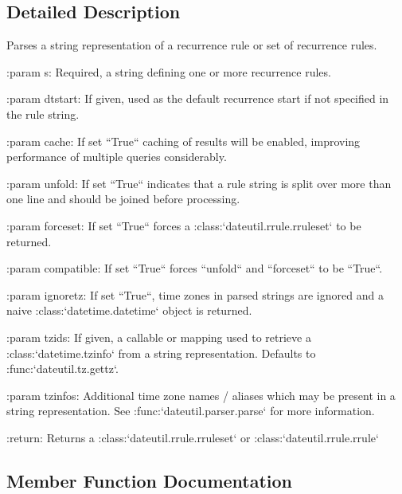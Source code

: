 \subsection{Detailed Description}
\begin{DoxyVerb}Parses a string representation of a recurrence rule or set of
recurrence rules.

:param s:
    Required, a string defining one or more recurrence rules.

:param dtstart:
    If given, used as the default recurrence start if not specified in the
    rule string.

:param cache:
    If set ``True`` caching of results will be enabled, improving
    performance of multiple queries considerably.

:param unfold:
    If set ``True`` indicates that a rule string is split over more
    than one line and should be joined before processing.

:param forceset:
    If set ``True`` forces a :class:`dateutil.rrule.rruleset` to
    be returned.

:param compatible:
    If set ``True`` forces ``unfold`` and ``forceset`` to be ``True``.

:param ignoretz:
    If set ``True``, time zones in parsed strings are ignored and a naive
    :class:`datetime.datetime` object is returned.

:param tzids:
    If given, a callable or mapping used to retrieve a
    :class:`datetime.tzinfo` from a string representation.
    Defaults to :func:`dateutil.tz.gettz`.

:param tzinfos:
    Additional time zone names / aliases which may be present in a string
    representation.  See :func:`dateutil.parser.parse` for more
    information.

:return:
    Returns a :class:`dateutil.rrule.rruleset` or
    :class:`dateutil.rrule.rrule`
\end{DoxyVerb}
 

\subsection{Member Function Documentation}
\mbox{\label{classdateutil_1_1rrule_1_1__rrulestr_abde53f71604fe9029860f233a31d67a9}} 
